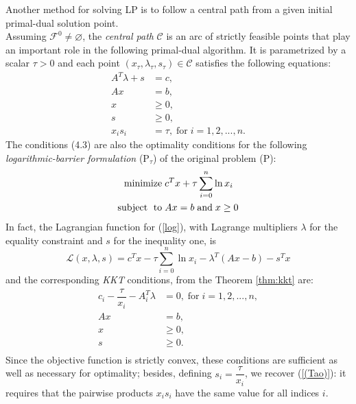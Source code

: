 \documentclass[a4paper,10 pt,titlepage,twoside]{book}
\theoremstyle{plain}
\theoremstyle{definition}
\theoremstyle{remark}
\begin{document}
Another method for solving LP is to follow a central path from a given initial primal-dual solution point.\\ Assuming $\mathcal{F}^{0}\neq \varnothing$, the \textit{central path} $\mathcal{C}$ is an arc of strictly feasible points that play an important role in the following primal-dual algorithm. It is parametrized by a scalar $\tau  > 0$ and each point $(x_{\tau}, \lambda_{\tau}, s_{\tau})\in \mathcal{C}$ satisfies the following equations:
\begin{align}
A^{T}\lambda+s&=c,\tag{4.3a}\\
Ax&=b,\tag{4.3b}\\\label{KKT2}
x&\geq 0,\tag{4.3c}\\
s&\geq 0,\tag{4.3d}\\
x_{i}s_{i}&= \tau,\; \text{for}\;i= 1,2,...,n.\tag{4.3e}\label{(Tao)}
\end{align} 
The conditions (4.3) are also the optimality conditions for the following \textit{logarithmic-barrier formulation} (P$_{\tau}$) of the original problem (P):
\begin{equation}\label{log}
\begin{split}
\text{minimize\;} &c^{T}x + \tau\sum_{i=0}^{n}\ln{x_{i}}\\
\text{subject\; to\;}&Ax = b\;\text{and\;} x\geq0
\end{split}
\end{equation}
In fact, the Lagrangian function for (\ref{log}), with Lagrange multipliers $\lambda$ for the equality constraint and $s$ for the inequality one, is
\begin{equation}
\mathcal{L}(x,\lambda,s)=c^{T}x- \tau\sum_{i=0}^{n}\ln{x_{i}}-\lambda^{T}\left(Ax-b\right)-s^{T}x
\end{equation}
and the corresponding \textit{KKT} conditions, from the Theorem \ref{thm:kkt} are:
\begin{align*}
c_{i} - \dfrac{\tau}{x_{i}} - A^{T}_{i}\lambda&= 0,\; \text{for}\;i = 1,2,...,n,\\
Ax&=b,\\
x&\geq 0,\\
s&\geq 0.\\
\end{align*}  
Since the objective function is strictly convex, these conditions are sufficient as well as necessary for optimality; besides, defining $s_{i} = \dfrac{\tau}{x_{i}}$, we recover (\ref{(Tao)}): it requires that the pairwise products $x_{i}s_{i}$ have the same value for all indices $i$.\\[0.5cm]
\end{document}
